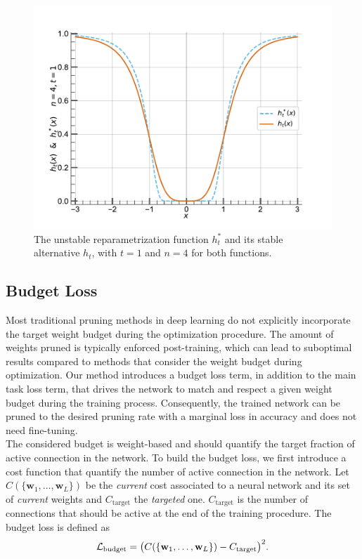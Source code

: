 \begin{figure}
  \centering
  \centerline{\includegraphics[width=0.5\linewidth]{chapter_1/assets/h_stable_vs_unstable.pdf}}
  \caption{\centering The unstable reparametrization function $h_t^*$ and its
  stable alternative $h_t$, with $t=1$ and $n=4$ for both functions.} 
  \label{fig:chap1:h_stable_vs_unstable}
\end{figure}

\subsection{Budget Loss}
\label{sec:chap1:budget_loss}

Most traditional pruning methods in deep learning do not explicitly incorporate
the target weight budget during the optimization procedure. The amount of
weights pruned is typically enforced post-training, which can lead to suboptimal
results compared to methods that consider the weight budget during optimization.
Our method introduces a budget loss term, in addition to the main task loss
term, that drives the network to match and respect a given weight budget during
the training process. Consequently, the trained network can be pruned to the
desired pruning rate with a marginal loss in accuracy and does not need
fine-tuning.\\


The considered budget is weight-based and should quantify the target fraction of
active connection in the network. To build the budget loss, we first introduce a
cost function that quantify the number of active connection in the network. Let
$C(\{\mathbf{w}_1,\dots, \mathbf{w}_L\})$ be the {\em current} cost associated
to a neural network and its set of {\em current} weights and $C_\text{target}$
the {\em targeted} one. $C_\text{target}$ is the number of connections that
should be active at the end of the training procedure. The budget loss is
defined as \\

\begin{equation}
  \label{eqn:chap1:simple_budget}
  {\cal L}_\text{budget} = \bigl( C(\{\mathbf{w}_1,\dots, \mathbf{w}_L\}) - C_\text{target} \bigr)^2.
\end{equation} \\


